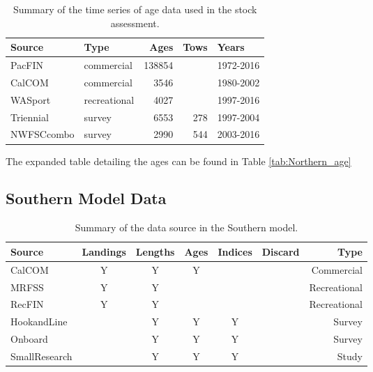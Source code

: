 \documentclass[12pt,]{article}
\begin{document}
\begin{table}[ht]
\centering
\caption{Summary of the
                                              time series of age data used in the stock
                                              assessment.} 
\label{tab:Age_sources}
\begin{tabular}{llrrl}
  \hline
Source & Type & Ages & Tows & Years \\ 
  \hline
PacFIN & commercial & 138854 &  & 1972-2016 \\ 
  CalCOM & commercial & 3546 &  & 1980-2002 \\ 
  WASport & recreational & 4027 &  & 1997-2016 \\ 
  Triennial & survey & 6553 & 278 & 1997-2004 \\ 
  NWFSCcombo & survey & 2990 & 544 & 2003-2016 \\ 
   \hline
\end{tabular}
\end{table}

The expanded table detailing the ages can be found in Table
\ref{tab:Northern_age}

\FloatBarrier
\newpage
\clearpage
\FloatBarrier

\subsection{Southern Model Data}\label{southern-model-data}

\vspace{.5cm}

\begin{table}[ht]
\centering
\caption{Summary of the data source in the Southern model.} 
\label{tab:Data_sources}
\begin{tabular}{lcccccr}
  \hline
Source & Landings & Lengths & Ages & Indices & Discard & Type \\ 
  \hline
CalCOM & Y & Y & Y &  &  & Commercial \\ 
  MRFSS & Y & Y &  &  &  & Recreational \\ 
  RecFIN & Y & Y &  &  &  & Recreational \\ 
  HookandLine &  & Y & Y & Y &  & Survey \\ 
  Onboard &  & Y & Y & Y &  & Survey \\ 
  SmallResearch &  & Y & Y & Y &  & Study \\ 
   \hline
\end{tabular}
\end{table}
\end{document}

